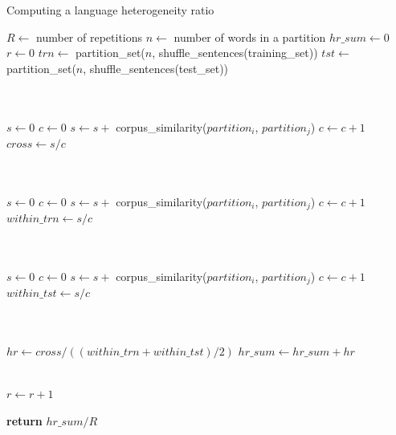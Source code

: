 \documentclass[output=paper,modfonts,nonflat,draftmode]{langsci/langscibook}
\begin{document}
\begin{algorithm}
\caption{\label{alg:heterogeneity-ratio}Computing a language heterogeneity ratio}
{\fontsize{9}{9}\selectfont
\begin{algorithmic}[1]
\State $R \gets$ number of repetitions
\State $n \gets$ number of words in a partition
\State $hr\_sum \gets 0$
\State $r \gets 0$
    \State $trn \gets $ partition\_set($n$, shuffle\_sentences(training\_set))
    \State $tst \gets $ partition\_set($n$, shuffle\_sentences(test\_set))
    
    \\ \\
    \State $s \gets 0$
    \State $c \gets 0$
            \State $s \gets s + $ corpus\_similarity($partition_i$, $partition_j$)
            \State $c \gets c + 1$
        \EndFor
    \EndFor
    \State $cross \gets s / c$

    \\ \\
    \State $s \gets 0$
    \State $c \gets 0$
            \State $s \gets s + $ corpus\_similarity($partition_i$, $partition_j$)
            \State $c \gets c + 1$
        \EndFor
    \EndFor
    \State $within\_trn \gets s / c$
    
    \\ \\
    \State $s \gets 0$
    \State $c \gets 0$
            \State $s \gets s + $ corpus\_similarity($partition_i$, $partition_j$)
            \State $c \gets c + 1$
        \EndFor
    \EndFor
    \State $within\_tst \gets s / c$
    
    \\ \\
    \State $hr \gets cross / ((within\_trn + within\_tst)/2)$
    \State $hr\_sum \gets hr\_sum + hr$
    
    \\
    \State $r \gets r + 1$
\EndWhile

\State \textbf{return} $hr\_sum / R$
\end{algorithmic}
}
\end{algorithm}
\end{document}
